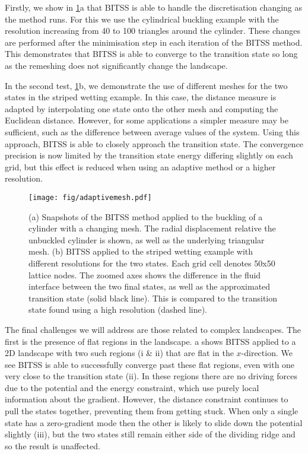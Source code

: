 \documentclass[aps,prl,twocolumn,10pt,groupedaddress]{revtex4-2}
\begin{document}
Firstly, we show in \cref{fig:adaptivemesh}a that BITSS is able to handle the discretisation changing as the method runs.
For this we use the cylindrical buckling example with the resolution increasing from 40 to 100 triangles around the cylinder.
These changes are performed after the minimisation step in each iteration of the BITSS method.
This demonstrates that BITSS is able to converge to the transition state so long as the remeshing does not significantly change the landscape.

In the second test, \cref{fig:adaptivemesh}b, we demonstrate the use of different meshes for the two states in the striped wetting example.
In this case, the distance measure is adapted by interpolating one state onto the other mesh and computing the Euclidean distance.
However, for some applications a simpler measure may be sufficient, such as the difference between average values of the system.
Using this approach, BITSS is able to closely approach the transition state.
The convergence precision is now limited by the transition state energy differing slightly on each grid, but this effect is reduced when using an adaptive method or a higher resolution.

\begin{figure}[tb]
  \texttt{[image: fig/adaptivemesh.pdf]}
  \caption{\label{fig:adaptivemesh}
    (a) Snapshots of the BITSS method applied to the buckling of a cylinder with a changing mesh.
        The radial displacement relative the unbuckled cylinder is shown, as well as the underlying triangular mesh.
    (b) BITSS applied to the striped wetting example with different resolutions for the two states.
        Each grid cell denotes 50x50 lattice nodes.
        The zoomed axes shows the difference in the fluid interface between the two final states, as well as the approximated transition state (solid black line).
        This is compared to the transition state found using a high resolution (dashed line).
  }
\end{figure}


The final challenges we will address are those related to complex landscapes.
The first is the presence of flat regions in the landscape.
a shows BITSS applied to a 2D landscape with two such regions (i \& ii) that are flat in the $x$-direction.
We see BITSS is able to successfully converge past these flat regions, even with one very close to the transition state (ii).
In these regions there are no driving forces due to the potential and the energy constraint, which use purely local information about the gradient.
However, the distance constraint continues to pull the states together, preventing them from getting stuck.
When only a single state has a zero-gradient mode then the other is likely to slide down the potential slightly (iii), but the two states still remain either side of the dividing ridge and so the result is unaffected.
\end{document}
